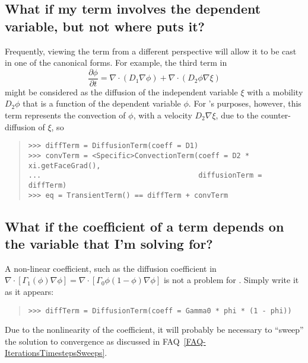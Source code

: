         \subsection{What if my term involves the dependent variable, 
            but not where \FiPy{} puts it?}
            
            Frequently, viewing the term from a different perspective
            will allow it to be cast in one of the canonical forms.
            For example, the third term in
            \[
                \frac{\partial \phi}{\partial t} 
                = \nabla\cdot\left( D_1 \nabla \phi\right)
                + \nabla\cdot\left( D_2 \phi \nabla \xi\right)
            \]
            might be considered as the diffusion of the independent
            variable $\xi$ with a mobility $D_2\phi$ that is a
            function of the dependent variable $\phi$.  For \FiPy{}'s
            purposes, however, this term represents the convection of
            $\phi$, with a velocity $D_2\nabla\xi$, due to the
            counter-diffusion of $\xi$, so
            \begin{quote}
\begin{verbatim}
>>> diffTerm = DiffusionTerm(coeff = D1)
>>> convTerm = <Specific>ConvectionTerm(coeff = D2 * xi.getFaceGrad(), 
...                                     diffusionTerm = diffTerm)
>>> eq = TransientTerm() == diffTerm + convTerm
\end{verbatim}
            \end{quote}

        \subsection{What if the coefficient of a term depends on 
            the variable that I'm solving for?}
            
            A non-linear coefficient, such as the diffusion 
            coefficient in \( 
            \nabla\cdot[\Gamma_1(\phi) \nabla \phi] = 
            \nabla\cdot[\Gamma_0 \phi (1 - \phi) \nabla\phi] \) is 
            not a problem for \FiPy. Simply write it as it appears:
            \begin{quote}
\begin{verbatim}
>>> diffTerm = DiffusionTerm(coeff = Gamma0 * phi * (1 - phi))
\end{verbatim}
            \end{quote}
            \begin{reSTadmonition}[Note]
            Due to the nonlinearity of the coefficient, it will
            probably be necessary to ``sweep'' the solution to
            convergence as discussed in
            FAQ~\ref{FAQ-IterationsTimestepsSweeps}.
            \end{reSTadmonition}


